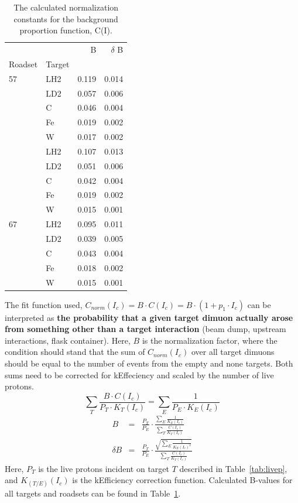 \begin{table}
	\centering
	\begin{tabular}{llrr}
		\toprule
		&             &  B &  $\delta$ B  \\
		Roadset & Target &                &       \\
		\midrule
		57 & LH2 &      0.119 &   0.014  \\
		&   LD2 &         0.057 &  0.006  \\
		& C &          0.046  &           0.004 \\
		& Fe &            0.019 &   0.002 \\
		& W &            0.017 &        0.002 \\ 
		\rowcol 62 & LH2 &      0.107 &   0.013  \\
		\rowcol &   LD2 &         0.051 &  0.006  \\
		\rowcol & C &          0.042 &           0.004 \\
		\rowcol & Fe &            0.019 &   0.002 \\
		\rowcol & W &            0.015 &        0.001 \\ 
		67 & LH2 &      0.095 &   0.011  \\
		&   LD2 &         0.039 &  0.005  \\
		& C &          0.043  &           0.004 \\
		& Fe &            0.018 &   0.002 \\
		& W &            0.015 &        0.001 \\ 
	\end{tabular}
	\caption{The calculated normalization constants for the background proportion function, C(I).}
	\label{tab:bg-b-vals}
\end{table}
The fit function used, $C_{norm}(I_c) = B \cdot C(I_c) = B \cdot (1 + p_1 \cdot I_c)$  can be interpreted as \textbf{the probability that a given target dimuon actually arose from something other than a target interaction} (beam dump, upstream interactions, flask container). Here, $B$ is the normalization factor, where the condition should stand that the sum of $C_{norm}(I_c)$ over all target dimuons should be equal to the number of events from the empty and none targets. Both sums need to be corrected for kEffeciency and scaled by the number of live protons.
\begin{equation}
\sum\limits_T \frac{B \cdot C(I_c)}{P_T \cdot K_T(I_c)} = \sum\limits_E \frac{1}{P_E \cdot K_E(I_c)}
\end{equation}
\begin{eqnarray}
B & = & \frac{P_T}{P_E} \cdot \frac{\sum\limits_E \frac{1}{K_E(I_c)}}{\sum\limits_T \frac{C(I_c)}{K_T(I_c)}} \\
\delta B & = & \frac{P_T}{P_E} \cdot \frac{\sqrt{\sum\limits_E \frac{1}{K_E(I_c)^2}}}{\sum\limits_T \frac{C(I_c)}{K_T(I_c)}}
\end{eqnarray}
Here, $P_T$ is the live protons incident on target $T$ described in Table~\ref{tab:livep}, and $K_{(T/E)}(I_c)$ is the kEfficiency correction function. Calculated B-values for all targets and roadsets can be found in Table~\ref{tab:bg-b-vals}.

